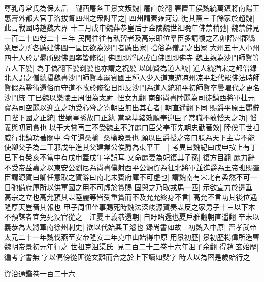 尊乳母常氏為保太后　隴西屠各王景文叛魏|{
	屠直於翻}
署置王侯魏統萬鎮將南陽王惠壽外都大官于洛拔督四州之衆討平之|{
	四州謂秦雍河涼}
徙其黨三千餘家於趙魏|{
	此言戰國時趙魏大界}
十二月戊申魏葬恭皇后于金陵魏世祖晩年佛禁稍弛|{
	魏禁佛見一百二十四卷二十三年}
民間往往有私習者及高宗即位羣臣多請復之乙卯詔州郡縣衆居之所各聽建佛圖一區民欲為沙門者聽出家|{
	捨俗為僧謂之出家}
大州五十人小州四十人於是曏所毁佛圖率皆修復|{
	佛圖即浮屠或白佛圖即佛寺}
魏主親為沙門師賢等五人下髪|{
	為于偽翻下髪剃髪也亦謂之祝髪}
以師賢為道人統|{
	道人統猶宋之都僧録北人謂之僧總攝魏書沙門師賢本罽賓國王種人少入道東遊凉州凉平赴代罷佛法時師賢假為毉術還俗而守道不改於修復日即反沙門為道人統和平初師賢卒曇曜代之更名沙門統}
丁巳魏以樂陵王周忸為太尉|{
	忸女九翻}
南部尚書陸麗為司徒鎮西將軍杜元寶為司空麗以迎立之功受心膂之寄朝臣無出其右者|{
	朝直遥翻下同}
賜爵平原王麗辭曰陛下國之正統|{
	世嫡皇孫故曰正紈}
當承基緒效順奉迎臣子常職不敢慆天之功|{
	慆義與叨同貪也}
以干大賞再三不受魏主不許麗曰臣父奉事先朝忠勤著效|{
	陸俟事世祖威行北鎮功著關中}
今年逼桑榆|{
	桑榆晚景也}
願以臣爵授之帝曰朕為天下主豈不能使卿父子為二王邪戊午進其父建業公俟爵為東平王　|{
	考異曰魏紀曰戊申按上有丁巳下有癸亥不當中有戊申蓋戊午字誤耳}
又命麗妻為妃復其子孫|{
	復方目翻}
麗力辭不受帝益嘉之以東安公劉尼為尚書僕射西平公源賀為征北將軍並進爵為王帝班賜羣臣謂源賀曰卿任意取之賀辭曰南北未賓府庫不可虛也|{
	謂魏南有宋北有柔然不可一日弛備府庫所以供軍國之用不可虛於賞賜}
固與之乃取戎馬一匹|{
	示欲宣力於邉垂}
高宗之立也高允預其謀陸麗等皆受重賞而不及允允終身不言|{
	高允不言功其後位遇隆厚天豈嗇其報也}
甲子周忸坐事賜死時魏法深峻源賀奏謀反之家男子十三以下本不預謀者宜免死没官從之　江夏王義恭還朝|{
	自盱眙還也夏戶雅翻朝直遥翻}
辛未以義恭為大將軍南徐州刺史|{
	欲以代始興王濬也}
録尚書如故　初魏入中原|{
	晉孝武帝太元二十一年魏伐燕至安帝隆安二年克中山始得中原}
用景初歷|{
	景初歷楊偉所造曹魏明帝景初元年行之}
世祖克沮渠氏|{
	見二百二十三卷十六年沮子余翻}
得趙玄始歷|{
	徧考字書無字以偏傍從匪從文離而合之於上下讀如斐字}
時人以為密是歲始行之

資治通鑑卷一百二十六
